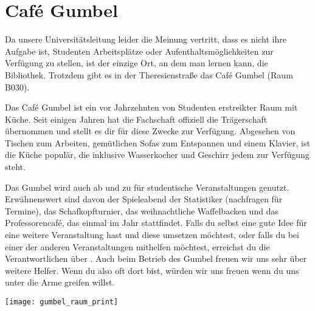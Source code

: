 
\chapter{Café Gumbel}

Da unsere Universitätsleitung leider die Meinung vertritt, dass es nicht ihre
Aufgabe ist, Studenten Arbeitsplätze oder Aufenthaltsmöglichkeiten zur Verfügung
zu stellen, ist der einzige Ort, an dem man lernen kann, die Bibliothek.
Trotzdem gibt es in der Theresienstraße das Café Gumbel (Raum B030).

Das Café Gumbel ist ein vor Jahrzehnten von Studenten erstreikter Raum mit
Küche. Seit einigen Jahren hat die Fachschaft offiziell die Trägerschaft
übernommen und stellt es dir für diese Zwecke zur Verfügung. Abgesehen von
Tischen zum Arbeiten, gemütlichen Sofas zum Entspannen und einem Klavier,
ist die Küche populär, die inklusive Wasserkocher und
Geschirr jedem zur Verfügung steht.

Das Gumbel wird auch ab und zu für studentische Veranstaltungen genutzt.
Erwähnenswert sind davon der Spieleabend der Statistiker (nachfragen für
Termine), das Schafkopfturnier, das weihnachtliche Waffelbacken und das
Professorencafé, das einmal im Jahr stattfindet.  Falls du selbst eine
gute Idee für eine weitere Veranstaltung hast und diese umsetzen möchtest,
oder falls du bei einer der anderen Veranstaltungen mithelfen möchtest,
erreichst du die Verantwortlichen über . Auch beim
Betrieb des Gumbel freuen wir uns sehr über weitere Helfer. Wenn du also
oft dort bist, würden wir uns freuen wenn du uns unter die Arme greifen willst.

\skiptobottom
\begin{center}
     \texttt{[image: gumbel\_raum\_print]}
\end{center}
